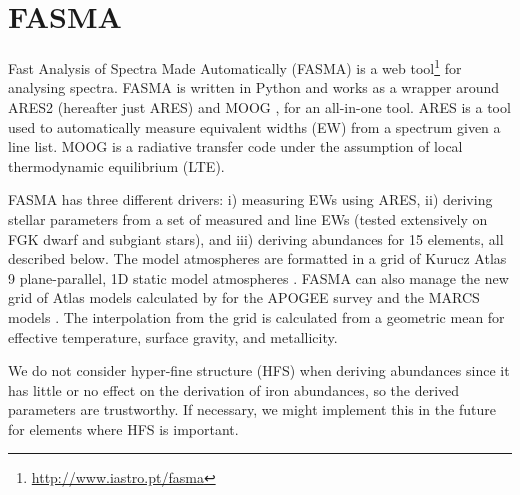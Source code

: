 \documentclass{aa}
\begin{document}
\section{FASMA}
\label{sec:FASMA}
Fast Analysis of Spectra Made Automatically (FASMA) is a web
tool\footnote{\url{http://www.iastro.pt/fasma}} for analysing spectra. FASMA is
written in Python and works as a wrapper around ARES2 \citep{Sousa2015a}
(hereafter just ARES) and MOOG \citep[][version 2014]{Sneden1973}, for an
all-in-one tool. ARES is a tool used to automatically measure equivalent widths (EW)
from a spectrum given a line list. MOOG is a radiative transfer code under the
assumption of local thermodynamic equilibrium (LTE).

FASMA has three different drivers: i) measuring EWs using ARES, ii) deriving
stellar parameters from a set of measured  and  line EWs
(tested extensively on FGK dwarf and subgiant stars), and iii) deriving
abundances for 15 elements, all described below. The model atmospheres are
formatted in a grid of Kurucz Atlas 9 plane-parallel, 1D static model
atmospheres \citep{Kurucz1993}. FASMA can also manage the new grid of Atlas
models calculated by \citet{Meszaros2012} for the APOGEE survey and the MARCS
models \citep{Gustafson2008}. The interpolation from the grid is calculated from
a geometric mean for effective temperature, surface gravity, and metallicity.

We do not consider hyper-fine structure (HFS) when deriving abundances since it
has little or no effect on the derivation of iron abundances, so the derived
parameters are trustworthy. If necessary, we might implement this in the future
for elements where HFS is important.
\end{document}
